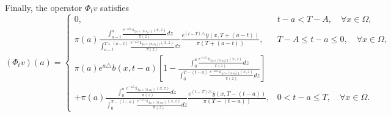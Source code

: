 \documentclass[10pt,a4paper]{amsart}
\makeatletter
\renewenvironment{proof}[1][\proofname]{\par
  \pushQED{\qed}%
  \normalfont \topsep6\p@\@plus6\p@\relax
  \trivlist
  \item[\hskip\labelsep
        \itshape
    #1\ \ref{#1}.]\ignorespaces
}{%
  \popQED\endtrivlist\@endpefalse
}
\makeatother
\begin{document}
\begin{proof}[of Proposition \ref{pr2.3}]
Finally, the operator \(\Phi_t v\) satisfies  
\begin{equation}
(\Phi_t v)(a) =
\begin{cases}
0, & t-a<T-A, \quad \forall x \in \Omega, \\
\pi(a) \frac{\int_{a-t}^{a} \frac{e^{-z\triangle} \mathds{1}_{\lbrace\omega\times[0,a_0]\rbrace}(x,z)}{\pi(z)} dz}{\int_{a-t}^{T+(a-t)} \frac{e^{-z\triangle} \mathds{1}_{\lbrace\omega\times[0,a_0]\rbrace}(x,z)}{\pi(z)} dz} \frac{e^{(t-T)\triangle} \bar{y}(x,T+(a-t))}{\pi(T+(a-t))}, & T-A \leq t-a \leq 0, \quad \forall x \in \Omega, \\
\pi(a)e^{a\triangle}b(x,t-a) \left[1 - \frac{\int_{0}^{a} \frac{e^{-z\triangle} \mathds{1}_{\lbrace\omega\times[0,a_0]\rbrace}(x,z)}{\pi(z)} dz}{\int_{0}^{T-(t-a)} \frac{e^{-z\triangle} \mathds{1}_{\lbrace\omega\times[0,a_0]\rbrace}(x,z)}{\pi(z)} dz} \right] \\
+ \pi(a) \frac{\int_{0}^{a} \frac{e^{-z\triangle} \mathds{1}_{\lbrace\omega\times[0,a_0]\rbrace}(x,z)}{\pi(z)} dz}{\int_{0}^{T-(t-a)} \frac{e^{-z\triangle} \mathds{1}_{\lbrace\omega\times[0,a_0]\rbrace}(x,z)}{\pi(z)} dz} \frac{e^{(t-T)\triangle} \bar{y}(x,T-(t-a))}{\pi(T-(t-a))}, & 0 < t-a \leq T, \quad \forall x \in \Omega.
\end{cases}
\end{equation}  
\end{proof}
\end{document}
